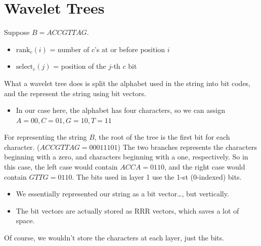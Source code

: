 \documentclass[10pt]{article}
\begin{document}
\section*{Wavelet Trees}
Suppose $B = ACCGTTAG$.
\begin{itemize}
    \item $\text{rank}_c(i)$ = number of $c$'s at or before position $i$
    \item $\text{select}_c(j)$ = position of the $j$-th $c$ bit
\end{itemize}
What a wavelet tree does is split the alphabet used in the string into bit codes, and the represent the string using bit vectors.
\begin{itemize}
    \item In our case here, the alphabet has four characters, so we can assign $A = 00, C = 01, G = 10, T = 11$
\end{itemize}
For representing the string $B$, the root of the tree is the first bit for each character.  ($ACCGTTAG = 00011101$)  The two branches represents the characters beginning with a zero, and characters beginning with a one, respectively.  So in this case, the left case would contain $ACCA = 0110$, and the right case would contain $GTTG = 0110$.  The bits used in layer 1 use the 1-st (0-indexed) bits.
\begin{itemize}
    \item We essentially represented our string as a bit vector\dots, but vertically.
    \item The bit vectors are actually stored as RRR vectors, which saves a lot of space.
\end{itemize}
\begin{center}
\end{center}
Of course, we wouldn't store the characters at each layer, just the bits.
\end{document}
